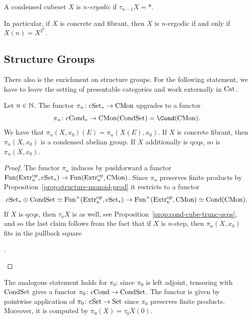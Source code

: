 \begin{definition}
A condensed cubeset $X$ is \emph{$n$-ergodic} if $\tau_{n-1} X = \ast$.
\end{definition}

In particular, if $X$ is concrete and fibrant, then $X$ is $n$-ergodic if and only if $X(n) = X^{2^n}$.


\subsection{Structure Groups}

There also is the enrichment on structure groups.
For the following statement, we have to leave the setting of presentable categories and work externally in $\mathrm{Cat}$.

\begin{proposition}
Let $n\in{\mathbb{N}}$.
The functor $\pi_n\colon\mathrm{cSet}_\ast\to\mathrm{CMon}$ upgrades to a functor
\[
    \pi_n\colon\cCond_\ast\to\cMon(\CondSet) = \Cond(\cMon).
\]
We have that $\pi_n(X,x_0)(E) = \pi_n(X(E),x_0)$.
If $X$ is concrete fibrant, then $\pi_n(X,x_0)$ is a condensed abelian group.
If $X$ additionally is qcqs, so is $\pi_n(X,x_0)$.
\end{proposition}

\begin{proof}
The functor $\pi_n$ induces by pushforward a functor $\operatorname{Fun}(\mathrm{Extr}_\kappa^{\mathrm{op}},\mathrm{cSet}_\ast)\to\operatorname{Fun}(\mathrm{Extr}_\kappa^{\mathrm{op}},\mathrm{CMon})$.
Since $\pi_n$ preserves finite products by Proposition~\ref{prop:structure-monoid-prod}
it restricts to a functor
\[
    \mathrm{cSet}_\ast\otimes\mathrm{CondSet}\simeq\operatorname{Fun}^\times(\mathrm{Extr}_\kappa^{\mathrm{op}},\mathrm{cSet}_\ast)\to\operatorname{Fun}^\times(\mathrm{Extr}_\kappa^{\mathrm{op}},\mathrm{CMon})\simeq\mathrm{Cond}(\mathrm{CMon}).
\]
If $X$ is qcqs, then $\tau_n X$ is as well, see Proposition~\ref{prop:cond-cube-trunc-qcqs},
and so the last claim follows from the fact that if $X$ is $n$-step, then $\pi_n(X,x_0)$ fits in the pullback square
\begin{center}
.
\end{center}
\end{proof}

\begin{remark}
The analogous statement holds for $\pi_0$:
since $\pi_0$ is left adjoint, tensoring with $\mathrm{CondSet}$ gives a functor $\pi_0\colon\mathrm{cCond}\to\mathrm{CondSet}$.
The functor is given by pointwise application of $\pi_0\colon\mathrm{cSet}\to\mathrm{Set}$ since $\pi_0$ preserves finite products.
Moreover, it is computed by $\pi_0(X) = \tau_0 X(0)$.
\end{remark}

